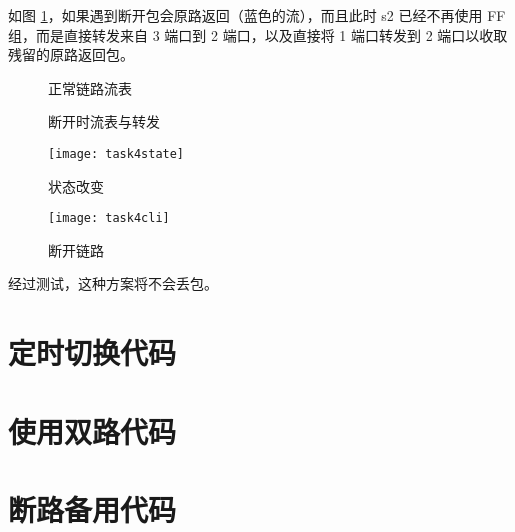     如图 \ref{fig:topobreak}，如果遇到断开包会原路返回（蓝色的流），而且此时 s2 已经不再使用 FF 组，而是直接转发来自 3 端口到 2 端口，以及直接将 1 端口转发到 2 端口以收取残留的原路返回包。

    \begin{figure}[H]
        \centering
        \begin{minipage}{0.48\textwidth}
            \centering
            
            \caption{正常链路流表}\label{fig:toponormal}
        \end{minipage}
        \begin{minipage}{0.48\textwidth}
            \centering
            
            \caption{断开时流表与转发}\label{fig:topobreak}
        \end{minipage}
    \end{figure}

    \begin{figure}[H]
        \centering
        \begin{minipage}{0.48\textwidth}
            \centering
            \texttt{[image: task4state]}
            \caption{状态改变}\label{fig:task4state}
        \end{minipage}
        \begin{minipage}{0.48\textwidth}
            \centering
            \texttt{[image: task4cli]}
            \caption{断开链路}\label{fig:task4cli}
        \end{minipage}
    \end{figure}

    经过测试，这种方案将不会丢包。


    

    \appendix

    \section{定时切换代码}\label{sec:per5}


    \section{使用双路代码}\label{sec:balance}


    \section{断路备用代码}\label{sec:backup}


